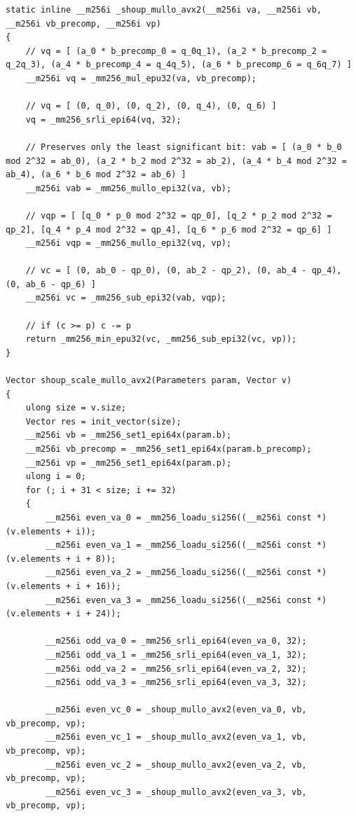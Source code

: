\documentclass{article}
\begin{document}
\begin{lstlisting}[caption = Variant 2 (AVX2), label = {list:variant2_avx2}]
static inline __m256i _shoup_mullo_avx2(__m256i va, __m256i vb, __m256i vb_precomp, __m256i vp)
{
    // vq = [ (a_0 * b_precomp_0 = q_0q_1), (a_2 * b_precomp_2 = q_2q_3), (a_4 * b_precomp_4 = q_4q_5), (a_6 * b_precomp_6 = q_6q_7) ]
    __m256i vq = _mm256_mul_epu32(va, vb_precomp);

    // vq = [ (0, q_0), (0, q_2), (0, q_4), (0, q_6) ]
    vq = _mm256_srli_epi64(vq, 32);

    // Preserves only the least significant bit: vab = [ (a_0 * b_0 mod 2^32 = ab_0), (a_2 * b_2 mod 2^32 = ab_2), (a_4 * b_4 mod 2^32 = ab_4), (a_6 * b_6 mod 2^32 = ab_6) ]
    __m256i vab = _mm256_mullo_epi32(va, vb);

    // vqp = [ [q_0 * p_0 mod 2^32 = qp_0], [q_2 * p_2 mod 2^32 = qp_2], [q_4 * p_4 mod 2^32 = qp_4], [q_6 * p_6 mod 2^32 = qp_6] ]
    __m256i vqp = _mm256_mullo_epi32(vq, vp);

    // vc = [ (0, ab_0 - qp_0), (0, ab_2 - qp_2), (0, ab_4 - qp_4), (0, ab_6 - qp_6) ]
    __m256i vc = _mm256_sub_epi32(vab, vqp);

    // if (c >= p) c -= p
    return _mm256_min_epu32(vc, _mm256_sub_epi32(vc, vp));
}

Vector shoup_scale_mullo_avx2(Parameters param, Vector v)
{
    ulong size = v.size;
    Vector res = init_vector(size);
    __m256i vb = _mm256_set1_epi64x(param.b);
    __m256i vb_precomp = _mm256_set1_epi64x(param.b_precomp);
    __m256i vp = _mm256_set1_epi64x(param.p);
    ulong i = 0;
    for (; i + 31 < size; i += 32)
    {
        __m256i even_va_0 = _mm256_loadu_si256((__m256i const *)(v.elements + i));
        __m256i even_va_1 = _mm256_loadu_si256((__m256i const *)(v.elements + i + 8));
        __m256i even_va_2 = _mm256_loadu_si256((__m256i const *)(v.elements + i + 16));
        __m256i even_va_3 = _mm256_loadu_si256((__m256i const *)(v.elements + i + 24));

        __m256i odd_va_0 = _mm256_srli_epi64(even_va_0, 32);
        __m256i odd_va_1 = _mm256_srli_epi64(even_va_1, 32);
        __m256i odd_va_2 = _mm256_srli_epi64(even_va_2, 32);
        __m256i odd_va_3 = _mm256_srli_epi64(even_va_3, 32);

        __m256i even_vc_0 = _shoup_mullo_avx2(even_va_0, vb, vb_precomp, vp);
        __m256i even_vc_1 = _shoup_mullo_avx2(even_va_1, vb, vb_precomp, vp);
        __m256i even_vc_2 = _shoup_mullo_avx2(even_va_2, vb, vb_precomp, vp);
        __m256i even_vc_3 = _shoup_mullo_avx2(even_va_3, vb, vb_precomp, vp);


\end{lstlisting}
\end{document}
